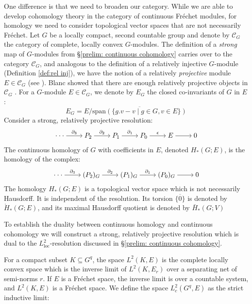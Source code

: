 \documentclass[12pt,reqno]{amsart}
\theoremstyle{definition}
\newcommand{\torH}{\mathring{H}}
\begin{document}
One difference is that we need to broaden our category. While we are able to develop cohomology theory in the category of continuous Fr\'echet modules, for homology we need to consider topological vector spaces that are not necessarily Fr\'echet. Let $G$ be a locally compact, second countable group and denote by $\mathcal{C}_G$ the category of complete, locally convex $G$-modules. 
The definition of a \emph{strong} map of $G$-modules from \S\ref{prelim: continuous cohomology} carries over to the category $\mathcal{C}_G$, and analogous to the definition of a relatively injective $G$-module (Definition \ref{def:rel inj}), we have the notion of a relatively \emph{projective} module $E \in \mathcal{C}_G$ (see \cite[Definition~C.18]{Petersen}). Blanc showed that there are enough relatively projective objects in $\mathcal{C}_G$ \cite{BlancHomology}. For a $G$-module $E \in \mathcal{C}_G$, we denote by $E_G$ the closed co-invariants of $G$ in $E$:
$$E_G=E / \overline{\mathrm{span}(\{g.v-v \mid g \in G, v \in E \})}$$
Consider a strong, relatively projective resolution:
\[
\begin{tikzcd}[cramped]
	{\cdot \cdot \cdot} & {P_2} & {P_1} & {P_0} & E & 0
	\arrow["{\partial_3}", from=1-1, to=1-2]
	\arrow["{\partial_2}", from=1-2, to=1-3]
	\arrow["{\partial_1}", from=1-3, to=1-4]
	\arrow["\epsilon", from=1-4, to=1-5]
	\arrow[from=1-5, to=1-6]
\end{tikzcd}
\]
The continuous homology of $G$ with coefficients in $E$, denoted $H_*(G;E)$, is the homology of the complex:
\[
\begin{tikzcd}[cramped]
	{\cdot \cdot \cdot} & {(P_2)_G} & ({P_1)_G} & {(P_0)_G} & 0
	\arrow["{\partial_3}", from=1-1, to=1-2]
	\arrow["{\partial_2}", from=1-2, to=1-3]
	\arrow["{\partial_1}", from=1-3, to=1-4]
	\arrow[from=1-4, to=1-5]
\end{tikzcd}
\]
The homology $H_*(G;E)$ is a topological vector space which is not necessarily Hausdorff. It is independent of the resolution. Its torsion $\overline{\{0\}}$ is denoted by $\torH_*(G;E)$, and its maximal Hausdorff quotient is denoted by $\bar{H}_*(G;V)$

To establish the duality between continuous homology and continuous cohomology we will construct a strong, relatively projective resolution which is dual to the $L^2_{\mathrm{loc}}$-resolution discussed in \S\ref{prelim: continuous cohomology}.

For a compact subset $K \subseteq G^q$, the space $L^2(K,E)$ is the complete locally convex space which is the inverse limit of $L^2(K,E_r)$ over a separating net of semi-norms $r$. If $E$ is a Fr\'echet space, the inverse limit is over a countable system, and $L^2(K,E)$ is a Fr\'echet space. We define the space $L^2_c(G^q,E)$ as the strict inductive limit:
\end{document}
